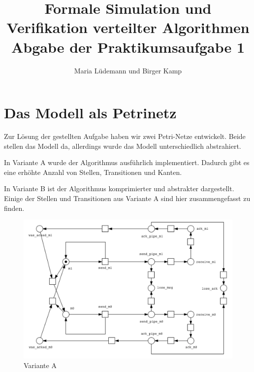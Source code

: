 \documentclass[]{scrartcl}
\title{Formale Simulation und Verifikation verteilter Algorithmen  \\ Abgabe der Praktikumsaufgabe 1}
\author{Maria Lüdemann und Birger Kamp}
\begin{document}
\maketitle

\begin{abstract}

\end{abstract}

\section{Das Modell als Petrinetz}
Zur Lösung der gestellten Aufgabe haben wir zwei Petri-Netze entwickelt. Beide stellen das Modell da, allerdings wurde das Modell unterschiedlich abstrahiert.

In Variante A wurde der Algorithmus ausführlich implementiert. Dadurch gibt es eine erhöhte Anzahl von Stellen, Transitionen und Kanten.

In Variante B ist der Algorithmus komprimierter und abstrakter dargestellt. Einige der Stellen und Transitionen aus Variante A sind hier zusammengefasst zu finden.
\begin{figure}[htbp]
	\centering
	\includegraphics[width=1\linewidth]{petrinet.png}
	\caption{Variante A}
	\label{fig:petri_net_A}
\end{figure}
\end{document}
